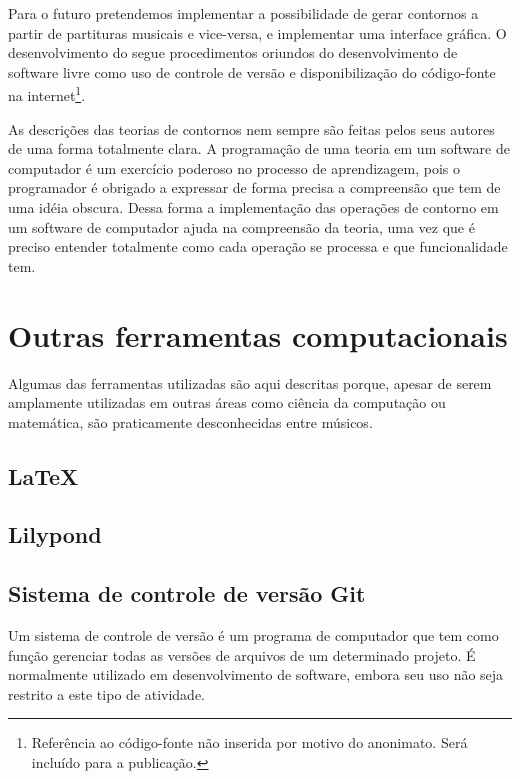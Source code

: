 Para o futuro pretendemos implementar a possibilidade de gerar
contornos a partir de partituras musicais e vice-versa, e implementar
uma interface gráfica. O desenvolvimento do \goiaba{} segue
procedimentos oriundos do desenvolvimento de software livre como uso
de controle de versão e disponibilização do código-fonte na
internet\footnote{Referência ao código-fonte não inserida por motivo
  do anonimato. Será incluído para a publicação.}.

As descrições das teorias de contornos nem sempre são feitas pelos
seus autores de uma forma totalmente clara. A programação de uma
teoria em um software de computador é um exercício poderoso no
processo de aprendizagem, pois o programador é obrigado a expressar de
forma precisa a compreensão que tem de uma idéia obscura. Dessa forma
a implementação das operações de contorno em um software de computador
ajuda na compreensão da teoria, uma vez que é preciso entender
totalmente como cada operação se processa e que funcionalidade tem.

\section{Outras ferramentas computacionais}
\label{sec:outr-ferr-comp}

Algumas das ferramentas utilizadas são aqui descritas porque, apesar
de serem amplamente utilizadas em outras áreas como ciência da
computação ou matemática, são praticamente desconhecidas entre
músicos.

\subsection{\LaTeX{}}
\label{sec:latex}

\subsection{Lilypond}
\label{sec:lilypond}

\subsection{Sistema de controle de versão Git}
\label{sec:sistema-de-controle}

Um sistema de controle de versão é um programa de computador que tem
como função gerenciar todas as versões de arquivos de um determinado
projeto. É normalmente utilizado em desenvolvimento de software,
embora seu uso não seja restrito a este tipo de atividade.

